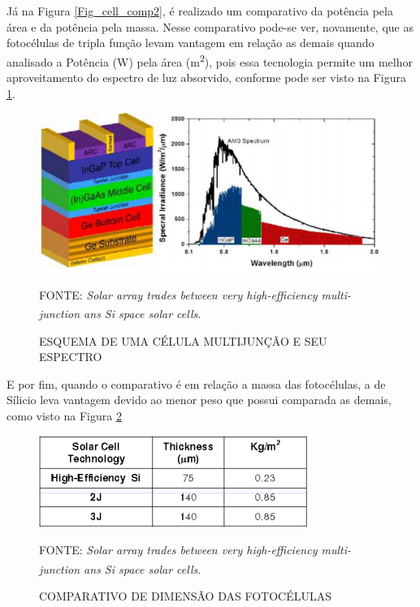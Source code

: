 \documentclass[
	12pt,				%
	openright,			%
	oneside,			%
	a4paper,			%
	english,			%
	french,				%
	spanish,			%
	brazil,				%
	oldfontcommands
	]{abntex2}
\begin{document}
	Já na Figura \ref{Fig_cell_comp2}, é realizado um comparativo da potência pela área e da potência pela massa. Nesse comparativo pode-se ver, novamente, que as fotocélulas de tripla função levam vantagem em relação as demais quando analisado a Potência (W) pela área (m\textsuperscript{2}), pois essa tecnologia permite um melhor aproveitamento do espectro de luz absorvido, conforme pode ser visto na Figura \ref{Fig_cell_mult}. 
	
	\begin{figure}[th]
		\caption{ESQUEMA DE UMA CÉLULA MULTIJUNÇÃO E SEU ESPECTRO}
		\label{Fig_cell_mult}
		\centering
		\includegraphics[width=.9\linewidth]{./figs/cell_mult}
			
		\begin{small}
			FONTE: \textit{Solar array trades between very high-efficiency multi-junction ans Si space solar cells}.\textsuperscript{\cite{Fatemi}}
		\end{small}		
	\end{figure}
	\pagebreak
	
	E por fim, quando o comparativo é em relação a massa das fotocélulas, a de Sílicio leva vantagem devido ao menor peso que possui comparada as demais, como visto na Figura \ref{Fig_cell_comp3}
	
	\begin{figure}[th]
		\caption{COMPARATIVO DE DIMENSÃO DAS FOTOCÉLULAS}
		\label{Fig_cell_comp3}
		\centering
		\includegraphics[width=0.6\linewidth]{./figs/cell_comp3}
			
		\begin{small}
			FONTE: \textit{Solar array trades between very high-efficiency multi-junction ans Si space solar cells}.\textsuperscript{\cite{Fatemi}}
		\end{small}		
	\end{figure}
	
\end{document}
